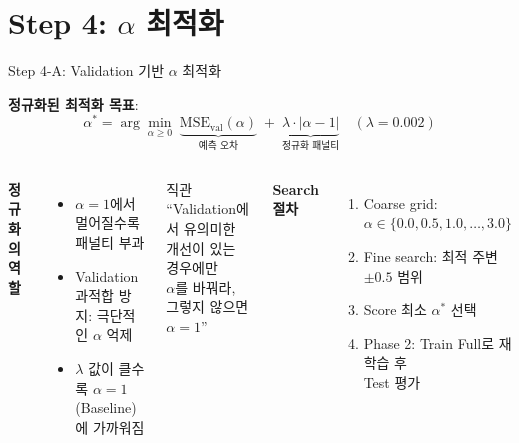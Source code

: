 \documentclass[aspectratio=169, 10pt]{beamer}
\begin{document}
\section{Step 4: $\alpha$ 최적화}

\begin{frame}{Step 4-A: Validation 기반 $\alpha$ 최적화}

  \textbf{정규화된 최적화 목표}:
  \[
    \alpha^* = \arg\min_{\alpha \ge 0}\;
    \underbrace{\text{MSE}_{\text{val}}(\alpha)}_{\text{예측 오차}}
    \;+\;
    \underbrace{\lambda \cdot |\alpha - 1|}_{\text{정규화 패널티}}
    \quad (\lambda = 0{.}002)
  \]

  \vspace{0.3em}
  \begin{columns}[T]
      \textbf{정규화의 역할}
      \begin{itemize}
        \item $\alpha = 1$에서 멀어질수록 패널티 부과
        \item Validation 과적합 방지: 극단적인 $\alpha$ 억제
        \item $\lambda$ 값이 클수록 $\alpha = 1$ (Baseline)에 가까워짐
      \end{itemize}
      \vspace{0.5em}
      \begin{exampleblock}{직관}
        ``Validation에서 유의미한 개선이 있는 경우에만\\
        $\alpha$를 바꿔라, 그렇지 않으면 $\alpha=1$''
      \end{exampleblock}

      \textbf{Search 절차}
      \begin{enumerate}
        \item Coarse grid: $\alpha \in\{0.0, 0.5, 1.0, \ldots, 3.0\}$
        \item Fine search: 최적 주변 $\pm 0.5$ 범위
        \item Score 최소 $\alpha^*$ 선택
        \item Phase 2: Train Full로 재학습 후\\
              Test 평가
      \end{enumerate}
  \end{columns}
\end{frame}
\end{document}
